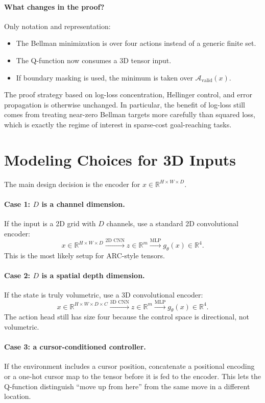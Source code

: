 \documentclass[11pt]{article}
\newcommand{\A}{\mathcal{A}}
\newcommand{\R}{\mathbb{R}}
\begin{document}
\paragraph{What changes in the proof?}
Only notation and representation:
\begin{itemize}[leftmargin=*]
  \item The Bellman minimization is over four actions instead of a generic finite set.
  \item The Q-function now consumes a 3D tensor input.
  \item If boundary masking is used, the minimum is taken over $\A_{\mathrm{valid}}(x)$.
\end{itemize}
The proof strategy based on log-loss concentration, Hellinger control, and error propagation is otherwise unchanged. In particular, the benefit of log-loss still comes from treating near-zero Bellman targets more carefully than squared loss, which is exactly the regime of interest in sparse-cost goal-reaching tasks.

\section{Modeling Choices for 3D Inputs}
The main design decision is the encoder for $x \in \R^{H \times W \times D}$.

\paragraph{Case 1: $D$ is a channel dimension.}
If the input is a 2D grid with $D$ channels, use a standard 2D convolutional encoder:
\[
x \in \R^{H \times W \times D}
\xrightarrow{\text{2D CNN}}
z \in \R^m
\xrightarrow{\text{MLP}}
g_\theta(x) \in \R^4.
\]
This is the most likely setup for ARC-style tensors.

\paragraph{Case 2: $D$ is a spatial depth dimension.}
If the state is truly volumetric, use a 3D convolutional encoder:
\[
x \in \R^{H \times W \times D \times C}
\xrightarrow{\text{3D CNN}}
z \in \R^m
\xrightarrow{\text{MLP}}
g_\theta(x) \in \R^4.
\]
The action head still has size four because the control space is directional, not volumetric.

\paragraph{Case 3: a cursor-conditioned controller.}
If the environment includes a cursor position, concatenate a positional encoding or a one-hot cursor map to the tensor before it is fed to the encoder. This lets the Q-function distinguish ``move up from here'' from the same move in a different location.
\end{document}
